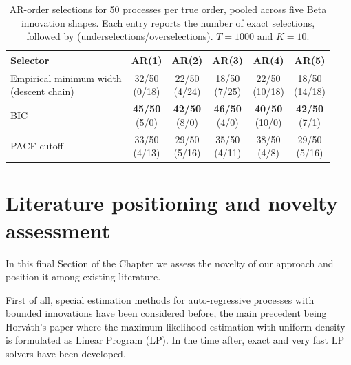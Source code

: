 \begin{table}[htbp]
\centering
\small
\caption{AR-order selections for 50 processes per true order,
pooled across five Beta innovation shapes.
Each entry reports the number of exact selections, followed by
(underselections/overselections). $T=1000$ and $K=10$.}
\label{tab:final-ar-order-selection}
\begin{tabular}{lccccc}
\toprule
Selector & AR(1) & AR(2) & AR(3) & AR(4) & AR(5) \\
\midrule
\shortstack[l]{Empirical minimum width\\(descent chain)}
& \shortstack{32/50 \\ (0/18)}
& \shortstack{22/50 \\ (4/24)}
& \shortstack{18/50 \\ (7/25)}
& \shortstack{22/50 \\ (10/18)}
& \shortstack{18/50 \\ (14/18)} \\
BIC
& \shortstack{\textbf{45/50} \\ (5/0)}
& \shortstack{\textbf{42/50} \\ (8/0)}
& \shortstack{\textbf{46/50} \\ (4/0)}
& \shortstack{\textbf{40/50} \\ (10/0)}
& \shortstack{\textbf{42/50} \\ (7/1)} \\
PACF cutoff
& \shortstack{33/50 \\ (4/13)}
& \shortstack{29/50 \\ (5/16)}
& \shortstack{35/50 \\ (4/11)}
& \shortstack{38/50 \\ (4/8)}
& \shortstack{29/50 \\ (5/16)} \\
\bottomrule
\end{tabular}
\end{table}

\section{Literature positioning and novelty assessment}

In this final Section of the Chapter we assess the novelty of our approach and position it among existing literature.

First of all, special estimation methods for auto-regressive processes with bounded innovations have been considered before, the main precedent being Horváth's paper where the maximum likelihood estimation with uniform density is formulated as Linear Program (LP). In the time after, exact and very fast LP solvers have been developed.

